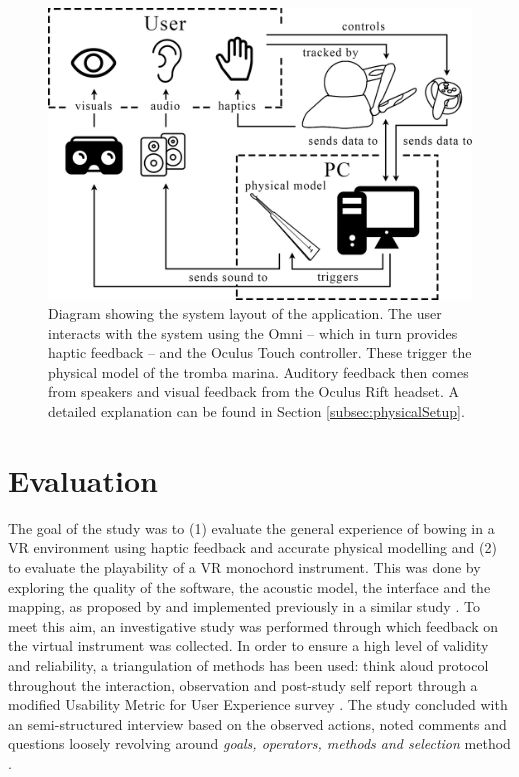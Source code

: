 \documentclass[dvipsnames, pdftex]{article}
\begin{document}
\begin{figure}[ht]\includegraphics[width=1.0\columnwidth]{SMC 2020 paper template LaTeX/figures/blockdiagram.png}
\centering
  \caption{Diagram showing the system layout of the application. The user interacts with the system using the Omni -- which in turn provides haptic feedback -- and the Oculus Touch controller. These trigger the physical model of the tromba marina. Auditory feedback then comes from speakers and visual feedback from the Oculus Rift headset. A detailed explanation can be found in Section \ref{subsec:physicalSetup}. \label{fig:systemLayout}}
\end{figure}

\section{Evaluation}\label{sec:eval}

The goal of the study was to (1) evaluate the  general experience of bowing in a VR environment using haptic feedback and accurate physical modelling and (2) to evaluate the  playability of a VR monochord instrument. This was done by exploring the quality of the software, the acoustic model, the interface and the mapping, as proposed by \cite{Barbosa2015} and implemented previously in a similar study \cite{Young2003}. To meet this aim, an investigative study was performed through which feedback on the virtual instrument was collected. In order to ensure a high level of validity and reliability, a triangulation of methods has been used: think aloud protocol \cite{Someren1994} throughout the interaction, observation and post-study self report through a modified Usability Metric for User Experience survey \cite{Finstad2010}. The study concluded with an semi-structured interview based on the observed actions, noted comments and questions loosely revolving around \textit{goals, operators, methods and selection} method \cite{Card1983}.
\end{document}
